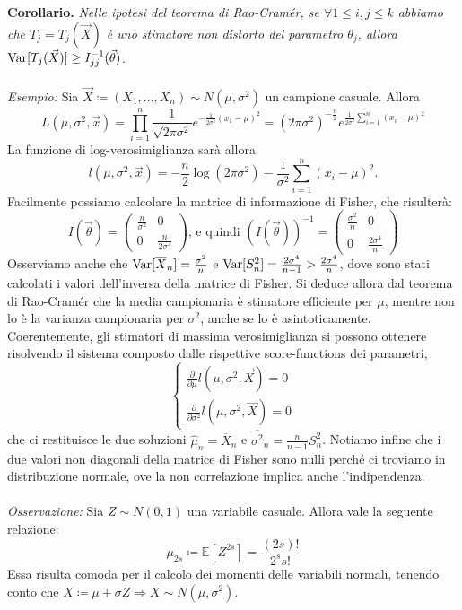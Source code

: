 \textbf{Corollario.} \textit{Nelle ipotesi del teorema di Rao-Cramér, se $\forall 1\leq i,j\leq k$ abbiamo che $T_j=T_j(\vec{X})$ è uno stimatore non distorto del parametro $\theta_j$, allora $\operatorname{Var}[T_j(\vec{X})]\geq I_{jj}^{-1}(\vec{\theta})$. }
\\
\\
\textit{Esempio:} Sia $\vec{X}\coloneqq (X_1,\ldots,X_n)\sim N(\mu, \sigma^2)$ un campione casuale. 
Allora  $$L(\mu,\sigma^2, \vec{x})=\prod_{i=1}^n \frac{1}{\sqrt{2\pi\sigma^2}} e^{-\frac{1}{2\sigma^2}(x_1-\mu)^2}= (2\pi\sigma^2)^{-\frac{n}{2}} e^{\frac{1}{2\sigma^2}\sum_{i=1}^n (x_i-\mu)^2}$$ La funzione di log-verosimiglianza sarà allora $$l(\mu,\sigma^2,\vec{x})=-\frac{n}{2}\log(2\pi\sigma^2)-\frac{1}{\sigma^2}\sum_{i=1}^n (x_i-\mu)^2.$$ Facilmente possiamo calcolare la matrice di informazione di Fisher, che risulterà:
$$
{I(\vec{\theta})}=\left(
\begin{array}{cc}
\frac{n}{\sigma^2} & 0 \\
0 & \frac{n}{2\sigma^4}
\end{array}
\right)
\mbox{,  e quindi }
{\left(I(\vec{\theta})\right)^{-1}}=\left(
\begin{array}{cc}
\frac{\sigma^2}{n} & 0 \\
0 & \frac{2\sigma^4}{n}
\end{array}
\right)
$$
Osserviamo anche che $\operatorname{Var}[\overline{X}_n]=\frac{\sigma^2}{n}$ e $\operatorname{Var}[S_n^2]=\frac{2\sigma^4}{n-1}>\frac{2\sigma^4}{n}$, dove sono stati calcolati i valori dell'inversa della matrice di Fisher. Si deduce allora dal teorema di Rao-Cramér che la media campionaria è stimatore efficiente per $\mu$, mentre non lo è la varianza campionaria per $\sigma^2$, anche se lo è asintoticamente.
Coerentemente, gli stimatori di massima verosimiglianza si possono ottenere risolvendo il sistema composto dalle rispettive score-functions dei parametri,
$$
\left\{
\begin{array}{lr}
\frac{\partial}{\partial\mu}l(\mu,\sigma^2,\vec{X})=0 \\
\frac{\partial}{\partial\sigma^2}l(\mu,\sigma^2,\vec{X})=0
\end{array}
\right.
$$
che ci restituisce le due soluzioni $\hat{\mu}_n=\overline{X}_n$ e $\hat{\sigma^2}_n=\frac{n}{n-1}S_n^2$. Notiamo infine che i due valori non diagonali della matrice di Fisher sono nulli perché ci troviamo in distribuzione normale, ove la non correlazione implica anche l'indipendenza.
\\
\\
\textit{Osservazione:} Sia $Z\sim N(0,1)$ una variabile casuale. Allora vale la seguente relazione: $$\mu_{2s}\coloneqq \mathbb{E}[Z^{2s}]=\frac{(2s)!}{2^s s!}$$ Essa risulta comoda per il calcolo dei momenti delle variabili normali, tenendo conto che $X\coloneqq \mu+\sigma Z \Longrightarrow X\sim N(\mu,\sigma^2)$.
